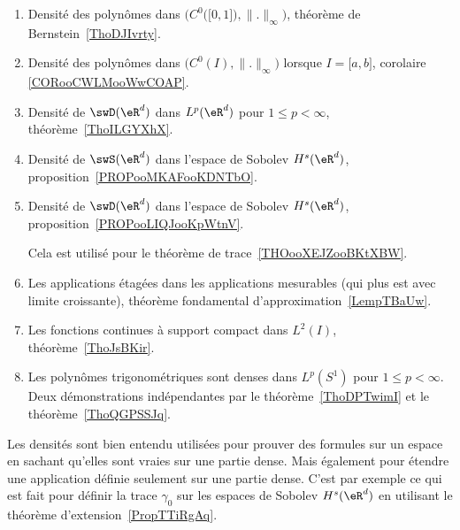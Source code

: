          \label{THEooPUIIooLDPUuq}
\begin{enumerate}
    \item
        Densité des polynômes dans \( \Big( C^0\big( \mathopen[ 0 , 1 \mathclose] \big),\| . \|_{\infty} \Big)\), théorème de Bernstein~\ref{ThoDJIvrty}.
    \item
        Densité des polynômes dans \( \big( C^0(I),\| . \|_{\infty} \big)\) lorsque \( I=\mathopen[ a , b \mathclose]\), corolaire \ref{CORooCWLMooWwCOAP}.
    \item
        Densité de \( \swD(\eR^d)\) dans \( L^p(\eR^d)\) pour \( 1\leq p<\infty\), théorème~\ref{ThoILGYXhX}.
    \item
        Densité de \( \swS(\eR^d)\) dans l'espace de Sobolev \( H^s(\eR^d)\), proposition~\ref{PROPooMKAFooKDNTbO}.

    \item
        Densité de \( \swD(\eR^d)\) dans l'espace de Sobolev \( H^s(\eR^d)\), proposition~\ref{PROPooLIQJooKpWtnV}.

        Cela est utilisé pour le théorème de trace~\ref{THOooXEJZooBKtXBW}.
    \item
        Les applications étagées dans les applications mesurables (qui plus est avec limite croissante), théorème fondamental d'approximation~\ref{LempTBaUw}.
    \item
        Les fonctions continues à support compact dans \( L^2(I)\), théorème~\ref{ThoJsBKir}.
    \item
        Les polynômes trigonométriques sont denses dans \( L^p(S^1)\) pour \( 1\leq p<\infty\). Deux démonstrations indépendantes par le théorème~\ref{ThoDPTwimI} et le théorème~\ref{ThoQGPSSJq}.
\end{enumerate}
Les densités sont bien entendu utilisées pour prouver des formules sur un espace en sachant qu'elles sont vraies sur une partie dense. Mais également pour étendre une application définie seulement sur une partie dense. C'est par exemple ce qui est fait pour définir la trace \( \gamma_0\) sur les espaces de Sobolev \( H^s(\eR^d)\) en utilisant le théorème d'extension~\ref{PropTTiRgAq}.

